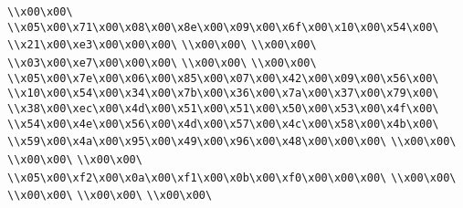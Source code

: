 \verb|\\x00\x00\|\newline
\verb|\\x05\x00\x71\x00\x08\x00\x8e\x00\x09\x00\x6f\x00\x10\x00\x54\x00\|\newline
\verb|\\x21\x00\xe3\x00\x00\x00\|\newline
\verb|\\x00\x00\|\newline
\verb|\\x00\x00\|\newline
\verb|\\x03\x00\xe7\x00\x00\x00\|\newline
\verb|\\x00\x00\|\newline
\verb|\\x00\x00\|\newline
\verb|\\x05\x00\x7e\x00\x06\x00\x85\x00\x07\x00\x42\x00\x09\x00\x56\x00\|\newline
\verb|\\x10\x00\x54\x00\x34\x00\x7b\x00\x36\x00\x7a\x00\x37\x00\x79\x00\|\newline
\verb|\\x38\x00\xec\x00\x4d\x00\x51\x00\x51\x00\x50\x00\x53\x00\x4f\x00\|\newline
\verb|\\x54\x00\x4e\x00\x56\x00\x4d\x00\x57\x00\x4c\x00\x58\x00\x4b\x00\|\newline
\verb|\\x59\x00\x4a\x00\x95\x00\x49\x00\x96\x00\x48\x00\x00\x00\|\newline
\verb|\\x00\x00\|\newline
\verb|\\x00\x00\|\newline
\verb|\\x00\x00\|\newline
\verb|\\x05\x00\xf2\x00\x0a\x00\xf1\x00\x0b\x00\xf0\x00\x00\x00\|\newline
\verb|\\x00\x00\|\newline
\verb|\\x00\x00\|\newline
\verb|\\x00\x00\|\newline
\verb|\\x00\x00\|\newline

